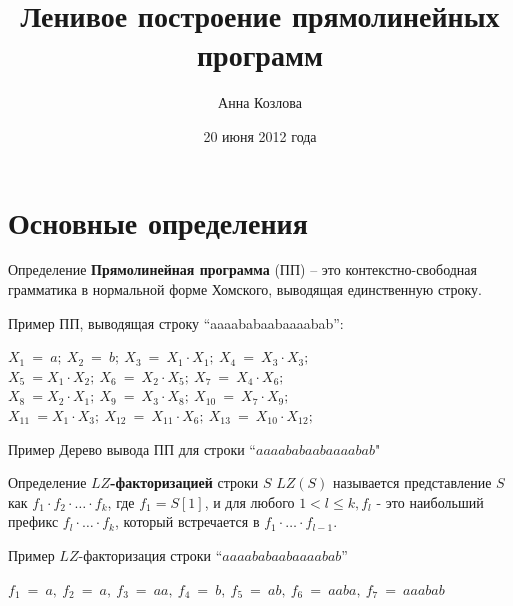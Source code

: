 \documentclass[utf8]{beamer}
\title{Ленивое построение прямолинейных программ}
\author{Анна Козлова}
\date{20 июня 2012 года}
\begin{document}
\begin{frame}
	\titlepage
\end{frame}

\section{Основные определения}

\begin{frame}
	\begin{block}{Определение}
	\textbf{Прямолинейная программа} (ПП) -- это контекстно-свободная
	грамматика в нормальной форме Хомского, выводящая единственную строку.  
	\end{block}
	
	\pause
	
	\begin{exampleblock}{Пример}
		ПП, выводящая строку ``aaaababaabaaaabab'':
		\begin{center} 
			$X_1\ =\ a;\ X_2\ =\ b;\ X_3\ =\ X_1\cdot X_1;\ X_4\ =\ X_3\cdot X_3;$
			\\
			$X_5\ = X_1\cdot X_2;\ X_6\ =\ X_2\cdot X_5;\ X_7\ =\ X_4\cdot X_6;$
			\\
			$X_8\ = X_2\cdot X_1;\ X_9\ =\ X_3\cdot X_8;\ X_{10}\ =\ X_7\cdot X_9;$
			\\
			$X_{11}\ = X_1\cdot X_3;\ X_{12}\ =\ X_{11}\cdot X_6;\ X_{13}\ =\ X_{10}\cdot
			X_{12};$
		\end{center}
	\end{exampleblock}
\end{frame}

\begin{frame}
	\begin{exampleblock}{Пример}
		Дерево вывода ПП для строки ``$aaaababaabaaaabab$"
		\picExample
	\end{exampleblock}
\end{frame}


\begin{frame}
	\begin{block}{Определение}
		\textbf{$LZ$-факторизацией} строки $S$ $LZ(S)$ называется представление $S$ как 
		$f_1 \cdot f_2 \cdot \ldots \cdot f_k$, где $f_1 = S[1]$, и для любого $1 < l
		\leq k, f_l$ - это наибольший префикс $f_l \cdot \ldots \cdot f_k$, который
		встречается в $f_1 \cdot \ldots \cdot f_{l-1}$. 
	\end{block}
	
	\pause
	
	\begin{exampleblock}{Пример}
		$LZ$-факторизация строки ``$aaaababaabaaaabab$''
		\begin{center} 
			$f_1\ =\ a,\ f_2\ =\ a,\ f_3\ =\ aa,\ f_4\ =\ b,\ f_5\ =\ ab,\ f_6\ =\ aaba,\
				f_7\ =\ aaabab$
		\end{center}
	\end{exampleblock}
\end{frame}
\end{document}
